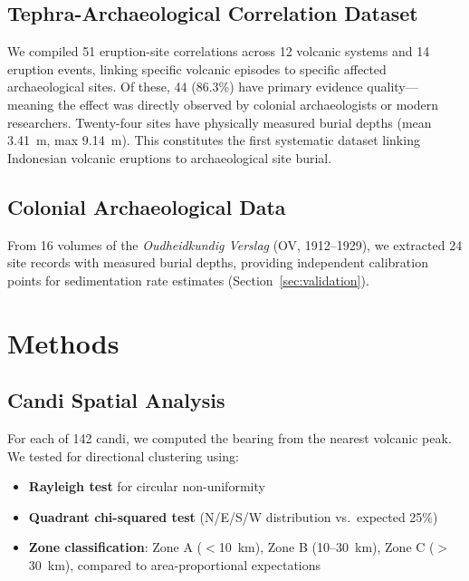 \documentclass[12pt,a4paper]{article}
\begin{document}
\subsection{Tephra-Archaeological Correlation Dataset}

We compiled 51 eruption-site correlations across 12 volcanic systems and 14 eruption events, linking specific volcanic episodes to specific affected archaeological sites. Of these, 44 (86.3\%) have primary evidence quality---meaning the effect was directly observed by colonial archaeologists or modern researchers. Twenty-four sites have physically measured burial depths (mean 3.41~m, max 9.14~m). This constitutes the first systematic dataset linking Indonesian volcanic eruptions to archaeological site burial.

\subsection{Colonial Archaeological Data}

From 16 volumes of the \emph{Oudheidkundig Verslag} (OV, 1912--1929), we extracted 24 site records with measured burial depths, providing independent calibration points for sedimentation rate estimates (Section~\ref{sec:validation}).

\section{Methods}

\subsection{Candi Spatial Analysis}
\label{sec:spatial}

For each of 142 candi, we computed the bearing from the nearest volcanic peak. We tested for directional clustering using:
\begin{itemize}
    \item \textbf{Rayleigh test} for circular non-uniformity
    \item \textbf{Quadrant chi-squared test} (N/E/S/W distribution vs.\ expected 25\%)
    \item \textbf{Zone classification}: Zone A ($<$10~km), Zone B (10--30~km), Zone C ($>$30~km), compared to area-proportional expectations
\end{itemize}
\end{document}
